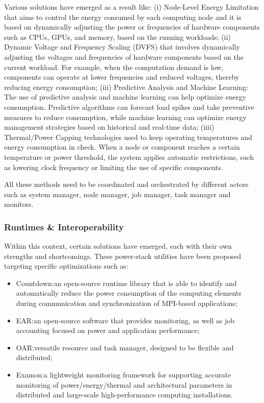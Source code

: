 Various solutions have emerged as a result like: (i) Node-Level Energy Limitation\cite{Node-leve-power-manager} that aims to control the energy consumed by each computing node and it is based on dynamically adjusting the power or frequencies of hardware components such as CPUs, GPUs, and memory, based on the running workloads; (ii) Dynamic Voltage and Frequency Scaling\cite{DVFS} (DVFS) that involves dynamically adjusting the voltages and frequencies of hardware components based on the current workload. For example, when the computation demand is low, components can operate at lower frequencies and reduced voltages, thereby reducing energy consumption; (iii) Predictive Analysis and Machine Learning\cite{MLEC}: The use of predictive analysis and machine learning can help optimize energy consumption. Predictive algorithms can forecast load spikes and take preventive measures to reduce consumption, while machine learning can optimize energy management strategies based on historical and real-time data; (iiii) Thermal/Power Capping\cite{intel2023reducing} technologies used to keep operating temperatures and energy consumption in check. When a node or component reaches a certain temperature or power threshold, the system applies automatic restrictions, such as lowering clock frequency or limiting the use of specific components.

\noindent All these methods need to be coordinated and orchestrated by different actors such as system manager, node manager, job manager, task manager and monitors.

\subsubsection {Runtimes \& Interoperability} \label{SSEC:runtimes}
Within this context, certain solutions have emerged, each with their own strengths and shortcomings. These power-stack utilities have been proposed targeting specific optimizations such as:
\begin{itemize}
    \item Countdown\cite{cesarini2019countdown}:\@ an open-source runtime library that is able to identify and automatically reduce the power consumption of the computing elements during communication and synchronization of MPI-based applications;
    \item EAR\cite{ear}:\@ an open-source software that provides monitoring, as well as job accounting focused on power and application performance;
    \item OAR\cite{oar}:\@ versatile resource and task manager, designed to be flexible and distributed;
    \item Examon\cite{Examon}:\@  a lightweight monitoring framework for supporting accurate monitoring of power/energy/thermal and architectural parameters in distributed and large-scale high-performance computing installations.
\end{itemize}

